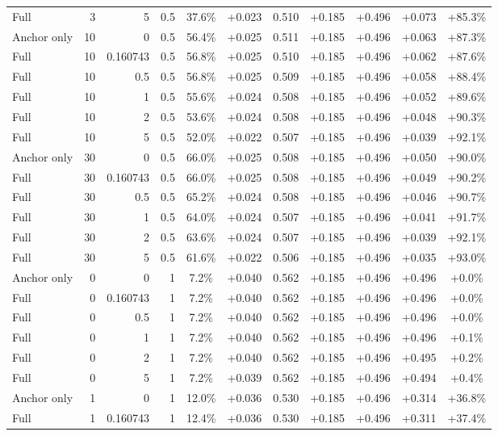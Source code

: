\begin{table}[htbp]
\begin{tabular}{lrrrccccccc}
Full & 3 & 5 & 0.5 & 37.6\% & +0.023 & 0.510 & +0.185 & +0.496 & +0.073 & +85.3\% \\
Anchor only & 10 & 0 & 0.5 & 56.4\% & +0.025 & 0.511 & +0.185 & +0.496 & +0.063 & +87.3\% \\
Full & 10 & 0.160743 & 0.5 & 56.8\% & +0.025 & 0.510 & +0.185 & +0.496 & +0.062 & +87.6\% \\
Full & 10 & 0.5 & 0.5 & 56.8\% & +0.025 & 0.509 & +0.185 & +0.496 & +0.058 & +88.4\% \\
Full & 10 & 1 & 0.5 & 55.6\% & +0.024 & 0.508 & +0.185 & +0.496 & +0.052 & +89.6\% \\
Full & 10 & 2 & 0.5 & 53.6\% & +0.024 & 0.508 & +0.185 & +0.496 & +0.048 & +90.3\% \\
Full & 10 & 5 & 0.5 & 52.0\% & +0.022 & 0.507 & +0.185 & +0.496 & +0.039 & +92.1\% \\
Anchor only & 30 & 0 & 0.5 & 66.0\% & +0.025 & 0.508 & +0.185 & +0.496 & +0.050 & +90.0\% \\
Full & 30 & 0.160743 & 0.5 & 66.0\% & +0.025 & 0.508 & +0.185 & +0.496 & +0.049 & +90.2\% \\
Full & 30 & 0.5 & 0.5 & 65.2\% & +0.024 & 0.508 & +0.185 & +0.496 & +0.046 & +90.7\% \\
Full & 30 & 1 & 0.5 & 64.0\% & +0.024 & 0.507 & +0.185 & +0.496 & +0.041 & +91.7\% \\
Full & 30 & 2 & 0.5 & 63.6\% & +0.024 & 0.507 & +0.185 & +0.496 & +0.039 & +92.1\% \\
Full & 30 & 5 & 0.5 & 61.6\% & +0.022 & 0.506 & +0.185 & +0.496 & +0.035 & +93.0\% \\
Anchor only & 0 & 0 & 1 & 7.2\% & +0.040 & 0.562 & +0.185 & +0.496 & +0.496 & +0.0\% \\
Full & 0 & 0.160743 & 1 & 7.2\% & +0.040 & 0.562 & +0.185 & +0.496 & +0.496 & +0.0\% \\
Full & 0 & 0.5 & 1 & 7.2\% & +0.040 & 0.562 & +0.185 & +0.496 & +0.496 & +0.0\% \\
Full & 0 & 1 & 1 & 7.2\% & +0.040 & 0.562 & +0.185 & +0.496 & +0.496 & +0.1\% \\
Full & 0 & 2 & 1 & 7.2\% & +0.040 & 0.562 & +0.185 & +0.496 & +0.495 & +0.2\% \\
Full & 0 & 5 & 1 & 7.2\% & +0.039 & 0.562 & +0.185 & +0.496 & +0.494 & +0.4\% \\
Anchor only & 1 & 0 & 1 & 12.0\% & +0.036 & 0.530 & +0.185 & +0.496 & +0.314 & +36.8\% \\
Full & 1 & 0.160743 & 1 & 12.4\% & +0.036 & 0.530 & +0.185 & +0.496 & +0.311 & +37.4\% \\

\end{tabular}
\end{table}
